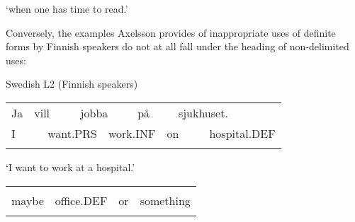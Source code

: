 \begin{styleTranslation}
‘when one has time to read.’

\end{styleTranslation}

Conversely, the examples Axelsson provides of inappropriate uses of definite forms by Finnish speakers do not at all fall under the heading of non-delimited uses:


\begin{listWWNumileveli}
\item 

\begin{styleExample}
\label{bkm:Ref115686476}Swedish L2 (Finnish speakers)

\end{styleExample}

\end{listWWNumileveli}

\begin{listWWNumlvileveli}
\item 

\end{listWWNumlvileveli}

\begin{tabular}{llllllllll}
\lsptoprule
Ja & \multicolumn{2}{l}{vill

} & \multicolumn{2}{l}{jobba

} & \multicolumn{2}{l}{på

} & \multicolumn{2}{l}{sjukhuset.

} & \\
\multicolumn{2}{l}{I

} & \multicolumn{2}{l}{want.PRS

} & \multicolumn{2}{l}{work.INF

} & \multicolumn{2}{l}{on

} & \multicolumn{2}{l}{hospital.DEF

}\\
\lspbottomrule
\end{tabular}

\begin{styleTranslation}
‘I want to work at a hospital.’

\end{styleTranslation}

\begin{tabular}{llll}
\lsptoprule
\multicolumn{4}{l}{kanske

}\\
maybe & office.DEF & or & something\\
\lspbottomrule
\end{tabular}

